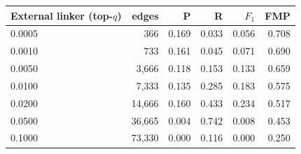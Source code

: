 \begin{tabular}{lrrrrr}
\toprule
External linker (top-$q$) & edges & P & R & $F_1$ & FMP \\
\midrule
0.0005 & 366 & 0.169 & 0.033 & 0.056 & 0.708 \\
0.0010 & 733 & 0.161 & 0.045 & 0.071 & 0.690 \\
0.0050 & 3,666 & 0.118 & 0.153 & 0.133 & 0.659 \\
0.0100 & 7,333 & 0.135 & 0.285 & 0.183 & 0.575 \\
0.0200 & 14,666 & 0.160 & 0.433 & 0.234 & 0.517 \\
0.0500 & 36,665 & 0.004 & 0.742 & 0.008 & 0.453 \\
0.1000 & 73,330 & 0.000 & 0.116 & 0.000 & 0.250 \\
\bottomrule
\end{tabular}